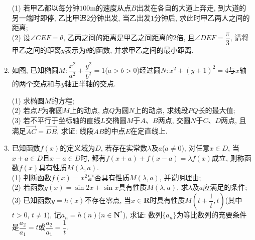 \documentclass[10pt,a4paper]{article}
\begin{document}
\begin{enumerate}[1.]
\begin{center}
\end{center}
(1) 若甲乙都以每分钟$100\text{m}$的速度从点$B$出发在各自的大道上奔走, 到大道的另一端时即停, 乙比甲迟$2$分钟出发, 当乙出发$1$分钟后, 求此时甲乙两人之间的距离;\\
(2) 设$\angle CEF=\theta$, 乙丙之间的距离是甲乙之间距离的$2$倍, 且$\angle DEF=\dfrac\pi3$, 请将甲乙之间的距离$y$表示为$\theta$的函数, 并求甲乙之间的最小距离.
\item 如图, 已知椭圆$M:\dfrac{x^2}{a^2}+\dfrac{y^2}{b^2}=1$($a>b>0$)经过圆$N:x^2+(y+1)^2=4$与$x$轴的两个交点和与$y$轴正半轴的交点.\\
\begin{center}
\end{center}
(1) 求椭圆$M$的方程;\\
(2) 若点$P$为椭圆$M$上的动点, 点$Q$为圆$N$上的动点, 求线段$PQ$长的最大值;\\
(3) 若不平行于坐标轴的直线$L$交椭圆$M$于$A$、$B$两点, 交圆$N$于$C$、$D$两点, 且满足$\overrightarrow{AC}=\overrightarrow{DB}$, 求证: 线段$AB$的中点$E$在定直线上.
\item 已知函数$f(x)$的定义域为$D$, 若存在实常数$\lambda$及$a$($a\ne 0$), 对任意$x\in D$, 当$x+a\in D$且$x-a\in D$时, 都有$f(x+a)+f(x-a)=\lambda f(x)$成立, 则称函数$f(x)$具有性质$M(\lambda,a)$.\\
(1) 判断函数$f(x)=x^2$是否具有性质$M(\lambda,a)$, 并说明理由;\\
(2) 若函数$g(x)=\sin 2x+\sin x$具有性质$M(\lambda,a)$, 求$\lambda$及$a$应满足的条件;\\
(3) 已知函数$y=h(x)$不存在零点, 当$x\in \mathbf{R}$时具有性质$M(t+\dfrac{1}{t},t)$(其中$t>0$, $t\ne 1$), 记$a_n=h(n)$($n\in \mathbf{N}^*$), 求证: 数列$\{a_n\}$为等比数列的充要条件是$\dfrac{a_2}{a_1}=t$或$\dfrac{a_2}{a_1}=\dfrac{1}{t}$.



\end{enumerate}
\end{document}
